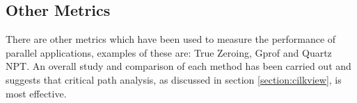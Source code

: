 \subsection{Other Metrics}
There are other metrics which have been used to measure the performance of parallel applications, examples of these are: True Zeroing\citep{id20}, Gprof\citep{id18} and Quartz NPT\citep{id19}. An overall study and comparison of each method has been carried out \citep{id4} and suggests that critical path analysis, as discussed in section \ref{section:cilkview}, is most effective.

